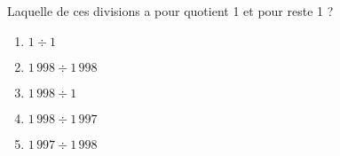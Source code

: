 Laquelle de ces divisions a pour quotient 1 et pour reste 1 ?
\begin{multicols}{5}
  \begin{enumerate}[A/]
  \item $1\div1$
  \item $1\,998\div1\,998$
  \item $1\,998\div1$
  \item $1\,998\div1\,997$
  \item $1\,997\div1\,998$
  \end{enumerate}
\end{multicols}